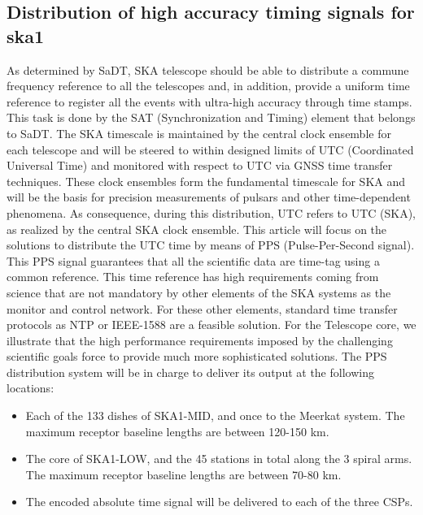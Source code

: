 \documentclass[review]{elsarticle}
\begin{document}

\subsection{Distribution of high accuracy timing signals for ska1}

As determined by SaDT, SKA telescope should be able to distribute a commune frequency reference to all the telescopes and, in addition, provide a uniform time reference to register all the events with ultra-high accuracy through time stamps. This task is done by the SAT (Synchronization and Timing) element that belongs to SaDT. The SKA timescale is maintained by the central clock ensemble for each telescope and will be steered to within designed limits of UTC (Coordinated Universal Time) and monitored with respect to UTC via GNSS time transfer techniques. These clock ensembles form the fundamental timescale for SKA and will be the basis for precision measurements of pulsars and other time-dependent phenomena. As consequence, during this distribution, UTC refers to UTC (SKA), as realized by the central SKA clock ensemble.
This article will focus on the solutions to distribute the UTC time by means of PPS (Pulse-Per-Second signal). This PPS signal guarantees that all the scientific data are time-tag using a common reference. This time reference has high requirements coming from science that are not mandatory by other elements of the SKA systems as the monitor and control network. For these other elements, standard time transfer protocols as NTP or IEEE-1588 are a feasible solution. For the Telescope core, we illustrate that the high performance requirements imposed by the challenging scientific goals force to provide much more sophisticated solutions. 
The PPS distribution system will be in charge to deliver its output at the following locations:

\begin{itemize}
	\item {Each of the 133 dishes of SKA1-MID, and once to the Meerkat system. The maximum receptor baseline lengths are between 120-150 km.}
	\item {The core of SKA1-LOW, and the 45 stations in total along the 3 spiral arms. The maximum receptor baseline lengths are between 70-80 km. }
	\item {The encoded absolute time signal will be delivered to each of the three CSPs.}
\end{itemize}
 
\end{document}
